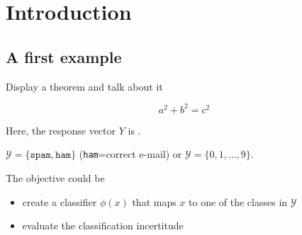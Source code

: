 \documentclass[unknownkeysallowed]{beamer}
\begin{document}
\section{Introduction}
\label{sec:introdcution}

\subsection{A first example}
\label{sub:un_premier_exemple}

\begin{frame}{Display a theorem and talk about it}

\vspace{0.4cm}

{
\begin{equation*}
a^2 + b^2 = c^2
\end{equation*}
}

\vspace{0.25cm}

Here, the response vector $Y$ is .

\vspace{0.25cm}

\exple
$\mathcal{Y} = \{\texttt{spam},  \texttt{ham}\}$ (\texttt{ham}=correct e-mail) or $\mathcal{Y}= \{0, 1, \dots,9\}$.

The objective could be
\begin{itemize}
	\item create a classifier $\phi(x)$ that maps $x$ to one of the classes in $\mathcal{Y}$
	\item evaluate the classification incertitude 
\end{itemize}


\end{frame}
\end{document}
